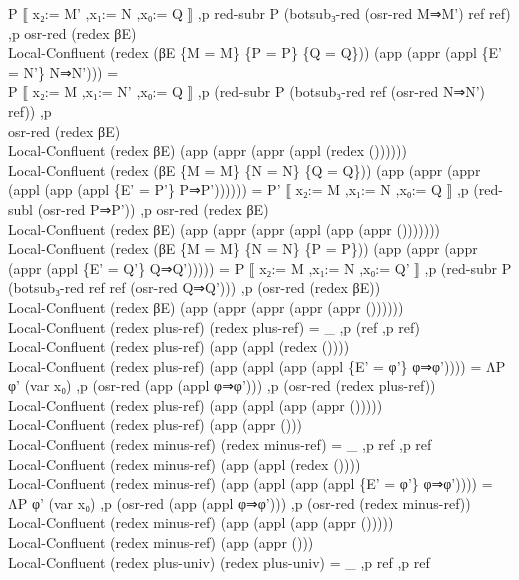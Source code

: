 {\begin{code}
{\>  P ⟦ x₂:= M' ,x₁:= N ,x₀:= Q ⟧ ,p red-subr P (botsub₃-red (osr-red M⇒M') ref ref) ,p osr-red (redex βE)\<\\
\>Local-Confluent (redex (βE \{M = M\} \{P = P\} \{Q = Q\})) (app (appr (appl \{E' = N'\} N⇒N'))) = \<\\
\>  P ⟦ x₂:= M ,x₁:= N' ,x₀:= Q ⟧ ,p (red-subr P (botsub₃-red ref (osr-red N⇒N') ref)) ,p \<\\
\>  osr-red (redex βE)\<\\
\>Local-Confluent (redex βE) (app (appr (appr (appl (redex ())))))\<\\
\>Local-Confluent (redex (βE \{M = M\} \{N = N\} \{Q = Q\})) (app (appr (appr (appl (app (appl \{E' = P'\} P⇒P')))))) = P' ⟦ x₂:= M ,x₁:= N ,x₀:= Q ⟧ ,p (red-subl (osr-red P⇒P')) ,p osr-red (redex βE)\<\\
\>Local-Confluent (redex βE) (app (appr (appr (appl (app (appr ()))))))\<\\
\>Local-Confluent (redex (βE \{M = M\} \{N = N\} \{P = P\})) (app (appr (appr (appr (appl \{E' = Q'\} Q⇒Q'))))) = P ⟦ x₂:= M ,x₁:= N ,x₀:= Q' ⟧ ,p (red-subr P (botsub₃-red ref ref (osr-red Q⇒Q'))) ,p (osr-red (redex βE))\<\\
\>Local-Confluent (redex βE) (app (appr (appr (appr (appr ())))))\<\\
\>Local-Confluent (redex plus-ref) (redex plus-ref) = \_ ,p (ref ,p ref)\<\\
\>Local-Confluent (redex plus-ref) (app (appl (redex ())))\<\\
\>Local-Confluent (redex plus-ref) (app (appl (app (appl \{E' = φ'\} φ⇒φ')))) = ΛP φ' (var x₀)  ,p (osr-red (app (appl φ⇒φ'))) ,p (osr-red (redex plus-ref))\<\\
\>Local-Confluent (redex plus-ref) (app (appl (app (appr ()))))\<\\
\>Local-Confluent (redex plus-ref) (app (appr ()))\<\\
\>Local-Confluent (redex minus-ref) (redex minus-ref) = \_ ,p ref ,p ref\<\\
\>Local-Confluent (redex minus-ref) (app (appl (redex ())))\<\\
\>Local-Confluent (redex minus-ref) (app (appl (app (appl \{E' = φ'\} φ⇒φ')))) = ΛP φ' (var x₀) ,p (osr-red (app (appl φ⇒φ'))) ,p (osr-red (redex minus-ref))\<\\
\>Local-Confluent (redex minus-ref) (app (appl (app (appr ()))))\<\\
\>Local-Confluent (redex minus-ref) (app (appr ()))\<\\
\>Local-Confluent (redex plus-univ) (redex plus-univ) = \_ ,p ref ,p ref\<\\
}
\end{code}}
